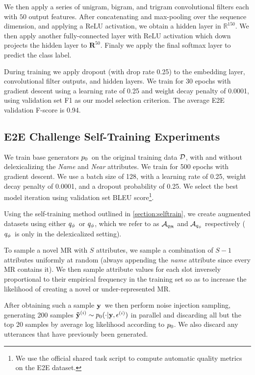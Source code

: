 We then apply a series of unigram, bigram, and trigram convolutional
filters each with $50$ output features.
After concatenating and max-pooling over the sequence dimension,
and applying a ReLU activation,
we obtain a hidden layer in $\mathbb{R}^{150}$.
We then apply another fully-connected layer with ReLU activation
which down projects the hidden layer to $\mathbf{R}^{50}$.
Finaly we apply the final softmax layer to predict the class label.

During training we apply dropout (with drop rate 0.25) to 
the embedding layer, convolutional filter outputs, and hidden
layers. We train for 30 epochs with gradient descent
using  a learning rate of 0.25 and 
weight decay penalty of 0.0001, using validation set F1
as our model selection criterion.
The average E2E validation F-score is 0.94.

\subsection{E2E Challenge Self-Training Experiments}
 We train base generators $p_0$~on the original training data $\mathcal{D}$, 
 with and without
delexicalizing the \textit{Name} and \textit{Near} attributes. 
We train for 500 epochs with gradient descent. We use a batch size of 128,
with a learning rate of 0.25, weight decay penalty of 0.0001, and a dropout 
probability of 0.25.
We select the best model iteration using validation
set BLEU score\footnote{We use the official shared task script to
compute automatic quality metrics on the E2E dataset.}.

Using the self-training method outlined in \autoref{section:selftrain},
we create augmented datasets using either ${q_{\phi} }$~or
${q_{\phi} }$, which we refer to as 
${\mathcal{A}}_{{q_{\mathfrak{R}} }}$ and ${\mathcal{A}}_{{q_{\phi} }}$ respectively 
(${q_{\phi} }$~is only in the delexicalized setting).

To sample a novel MR with  $S$ attributes, we sample a combination of $S-1$ attributes
uniformly at random %
(always appending the \textit{name} attribute since every MR contains it).
 We 
then sample attribute values for each slot %
inversely proportional to their empirical frequency
in the training set so as to increase the likelihood of creating a novel
or under-represented MR.


After obtaining such a sample $\mathbf{y}$~we then perform noise injection sampling,
generating 200 samples $\boldsymbol{\tilde{\mathbf{y}}}^{(i)} \sim 
p_0(\cdot|\mathbf{y}, \epsilon^{(i)})$ 
in parallel and discarding all but the top 20
samples by average log likelihood according to $p_0$.
We also discard any utterances that have previously been generated.

